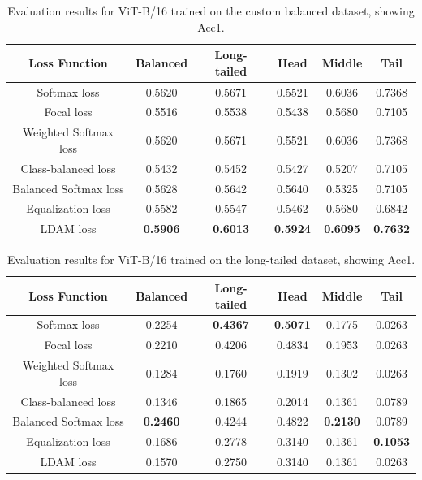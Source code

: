 \begin{table}[h!]
    \centering
    \caption{Evaluation results for ViT-B/16 trained on the custom balanced dataset, showing Acc1.}
    \begin{tabular}{cccccc}
        \toprule
        Loss Function & Balanced & Long-tailed & Head & Middle & Tail \\ 
        \midrule
        Softmax loss   & 0.5620 & 0.5671 & 0.5521 & 0.6036 & 0.7368 \\
        Focal loss   & 0.5516 & 0.5538 & 0.5438 & 0.5680 & 0.7105 \\
        Weighted Softmax loss   & 0.5620 & 0.5671 & 0.5521 & 0.6036 & 0.7368 \\
        Class-balanced loss   & 0.5432 & 0.5452 & 0.5427 & 0.5207 & 0.7105 \\
        Balanced Softmax loss   & 0.5628 & 0.5642 & 0.5640 & 0.5325 & 0.7105 \\
        Equalization loss   & 0.5582 & 0.5547 & 0.5462 & 0.5680 & 0.6842 \\
        LDAM loss   & \textbf{0.5906} &  \textbf{0.6013} & \textbf{0.5924} & \textbf{0.6095} & \textbf{0.7632} \\
        \bottomrule
    \end{tabular}
    \label{tab:vit_bal_acc1_1}
\end{table}


\begin{table}[h!]
    \centering
    \caption{Evaluation results for ViT-B/16 trained on the long-tailed dataset, showing Acc1.}
    \begin{tabular}{cccccc}
        \toprule
        Loss Function & Balanced & Long-tailed & Head & Middle & Tail \\ 
        \midrule
        Softmax loss   & 0.2254 & \textbf{0.4367} & \textbf{0.5071} & 0.1775 & 0.0263 \\
        Focal loss   & 0.2210 & 0.4206 & 0.4834 & 0.1953 & 0.0263 \\
        Weighted Softmax loss   & 0.1284 & 0.1760 & 0.1919 & 0.1302 & 0.0263 \\
        Class-balanced loss   & 0.1346 & 0.1865 & 0.2014 & 0.1361 & 0.0789 \\
        Balanced Softmax loss   & \textbf{0.2460} & 0.4244 & 0.4822 &  \textbf{0.2130} & 0.0789 \\
        Equalization loss   & 0.1686 & 0.2778 & 0.3140 & 0.1361 & \textbf{0.1053} \\
        LDAM loss   & 0.1570 & 0.2750 & 0.3140 & 0.1361 & 0.0263 \\
        \bottomrule
    \end{tabular}
    \label{tab:vit_lt_acc1}
\end{table}

